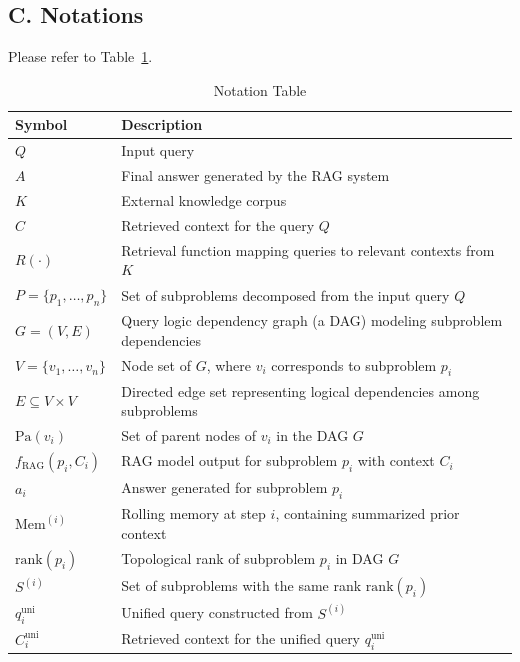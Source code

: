 \subsection*{C. Notations}

Please refer to Table~\ref{tab:notation}.


\begin{table}[hpt]
\centering
\begin{tabular}{ll}
\toprule
\textbf{Symbol} & \textbf{Description} \\
\midrule
$Q$ & Input query \\
$A$ & Final answer generated by the RAG system \\
$K$ & External knowledge corpus \\
$C$ & Retrieved context for the query $Q$ \\
$R(\cdot)$ & Retrieval function mapping queries to relevant contexts from $K$ \\
$P = \{p_1, \dots, p_n\}$ & Set of subproblems decomposed from the input query $Q$ \\
$G = (V, E)$ & Query logic dependency graph (a DAG) modeling subproblem dependencies \\
$V = \{v_1, \dots, v_n\}$ & Node set of $G$, where $v_i$ corresponds to subproblem $p_i$ \\
$E \subseteq V \times V$ & Directed edge set representing logical dependencies among subproblems \\
$\mathrm{Pa}(v_i)$ & Set of parent nodes of $v_i$ in the DAG $G$ \\
$f_{\mathrm{RAG}}(p_i, C_i)$ & RAG model output for subproblem $p_i$ with context $C_i$ \\
$a_i$ & Answer generated for subproblem $p_i$ \\
$\mathrm{Mem}^{(i)}$ & Rolling memory at step $i$, containing  summarized prior context \\
$\mathrm{rank}(p_i)$ & Topological rank of subproblem $p_i$ in DAG $G$ \\
$S^{(i)}$ & Set of subproblems with the same  rank $\mathrm{rank}(p_i)$ \\
$q^{\mathrm{uni}}_i$ & Unified query constructed from $S^{(i)}$ \\
$C^{\mathrm{uni}}_i$ & Retrieved context for the unified query $q^{\mathrm{uni}}_i$ \\
\bottomrule
\end{tabular}
\caption{Notation Table}
\label{tab:notation}
\end{table}


